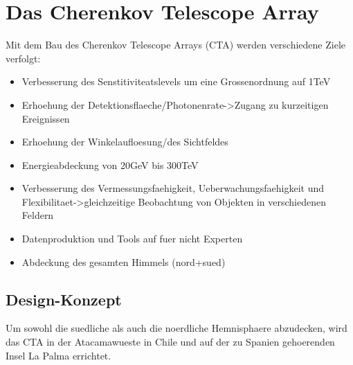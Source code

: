 \chapter{Das Cherenkov Telescope Array}
Mit dem Bau des Cherenkov Telescope Arrays (CTA) werden verschiedene Ziele verfolgt:
\begin{itemize}

\item Verbesserung des Senstitiviteatslevels um eine Grossenordnung auf 1TeV
\item Erhoehung der Detektionsflaeche/Photonenrate->Zugang zu kurzeitigen Ereignissen
\item Erhoehung der Winkelaufloesung/des Sichtfeldes
\item Energieabdeckung von 20GeV bis 300TeV
\item Verbesserung des Vermessungsfaehigkeit, Ueberwachungsfaehigkeit und Flexibilitaet->gleichzeitige Beobachtung von Objekten in verschiedenen Feldern
\item Datenproduktion und Tools auf fuer nicht Experten
\item Abdeckung des gesamten Himmels (nord+sued)
\end{itemize}

\section{Design-Konzept}
Um sowohl die suedliche als auch die noerdliche Hemnisphaere abzudecken, wird das CTA in der Atacamawueste in Chile und auf der zu Spanien gehoerenden Insel La Palma errichtet.
